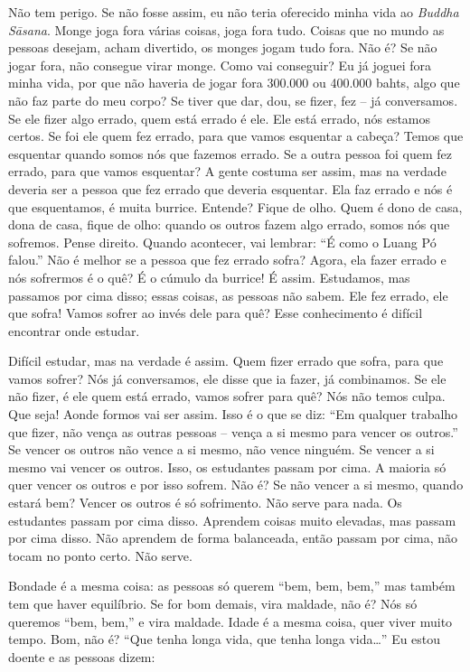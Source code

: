 Não tem perigo. Se não fosse assim, eu não teria oferecido minha
vida ao \emph{Buddha Sāsana}. Monge joga fora várias coisas, joga
fora tudo. Coisas que no mundo as pessoas desejam, acham divertido, os
monges jogam tudo fora. Não é? Se não jogar fora, não consegue virar
monge. Como vai conseguir? Eu já joguei fora minha vida, por que não
haveria de jogar fora 300.000 ou 400.000 bahts, algo que não faz parte
do meu corpo? Se tiver que dar, dou, se fizer, fez – já conversamos. Se
ele fizer algo errado, quem está errado é ele. Ele está errado, nós
estamos certos. Se foi ele quem fez errado, para que vamos esquentar a
cabeça? Temos que esquentar quando somos nós que fazemos errado. Se a
outra pessoa foi quem fez errado, para que vamos esquentar? A gente
costuma ser assim, mas na verdade deveria ser a pessoa que fez errado
que deveria esquentar. Ela faz errado e nós é que esquentamos, é muita
burrice. Entende? Fique de olho. Quem é dono de casa, dona de casa,
fique de olho: quando os outros fazem algo errado, somos nós que
sofremos. Pense direito. Quando acontecer, vai lembrar: “É como o Luang
Pó falou.” Não é melhor se a pessoa que fez errado sofra? Agora, ela
fazer errado e nós sofrermos é o quê? É o cúmulo da burrice! É assim.
Estudamos, mas passamos por cima disso; essas coisas, as pessoas não
sabem. Ele fez errado, ele que sofra! Vamos sofrer ao invés dele para
quê? Esse conhecimento é difícil encontrar onde estudar.

Difícil estudar, mas na verdade é assim. Quem fizer errado que
sofra, para que vamos sofrer? Nós já conversamos, ele disse que ia
fazer, já combinamos. Se ele não fizer, é ele quem está errado, vamos
sofrer para quê? Nós não temos culpa. Que seja! Aonde formos vai ser
assim. Isso é o que se diz: “Em qualquer trabalho que fizer, não vença
as outras pessoas – vença a si mesmo para vencer os outros.” Se vencer
os outros não vence a si mesmo, não vence ninguém. Se vencer a si mesmo
vai vencer os outros. Isso, os estudantes passam por cima. A maioria só
quer vencer os outros e por isso sofrem. Não é? Se não vencer a si
mesmo, quando estará bem? Vencer os outros é só sofrimento. Não serve
para nada. Os estudantes passam por cima disso. Aprendem coisas muito
elevadas, mas passam por cima disso. Não aprendem de forma balanceada,
então passam por cima, não tocam no ponto certo. Não serve.

Bondade é a mesma coisa: as pessoas só querem “bem, bem, bem,” mas
também tem que haver equilíbrio. Se for bom demais, vira maldade, não
é? Nós só queremos “bem, bem,” e vira maldade. Idade é a mesma coisa,
quer viver muito tempo. Bom, não é? “Que tenha longa vida, que tenha
longa vida\ldots{}” Eu estou doente e as pessoas dizem: 

